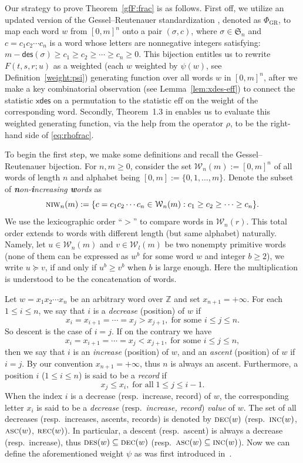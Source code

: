 \documentclass[12pt]{amsart}
\numberwithin{equation}{section}
\theoremstyle{plain}
\theoremstyle{definition}
\newcommand{\Z}{\mathbb{Z}}
\def\xdes{\mathsf{xdes}}
\def\DES{\hbox{\rm\textsc{des}}}
\def\DEC{\hbox{\rm\textsc{dec}}}
\def\INC{\hbox{\rm\textsc{inc}}}
\def\REC{\hbox{\rm\textsc{rec}}}
\def\NIW{\hbox{\rm\textsc{niw}}}
\def\des{\mathsf{des}}
\def\S{\mathfrak{S}}
\def\W{\mathcal{W}}
\def\eff{\mathrm{eff}}
\def\ASC{\hbox{\rm\textsc{asc}}}
\begin{document}
Our strategy to prove Theorem~\ref{gfF:frac} is as follows. First off, we utilize an updated version of the Gessel--Reutenauer standardization \cite{ge, fh, fh3}, denoted as $\Phi_{\mathrm{GR}}$, to map each word $w$ from $[0,m]^n$ onto a pair $(\sigma,c)$, where $\sigma\in\S_n$ and $c=c_1c_2\cdots c_n$ is a word whose letters are nonnegative integers satisfying: $m-\des(\sigma)\ge c_1\ge c_2\ge\cdots\ge c_n\ge 0$. This bijection entitles us to rewrite $F(t,s,r ;u)$ as a weighted (each $w$ weighted by $\psi(w)$, see Definition~\ref{weight:psi}) generating function over all words $w$ in $[0,m]^n$, after we make a key combinatorial observation (see Lemma~\ref{lem:xdes-eff}) to connect the statistic $\xdes$ on a permutation to the statistic $\eff$ on the weight of the corresponding word. Secondly, Theorem~1.3 in \cite{fh} enables us to evaluate this weighted generating function, via the help from the operator $\rho$, to be the right-hand side of \eqref{eq:rhofrac}. 

To begin the first step, we make some definitions and recall the Gessel--Reutenauer bijection. For $n,m\ge 0$, consider the set $\W_n(m):=[0,m]^n$ of all words of length $n$ and alphabet being $[0,m]:=\{0,1,\ldots,m\}$. Denote the subset of {\em {\bf\em n}on-{\bf\em i}ncreasing {\bf\em w}ords} as
$$\NIW_n(m):=\{c=c_1c_2\cdots c_n\in\W_n(m): c_1\ge c_2\ge\cdots\ge c_n\}.$$
We use the lexicographic order ``$>$'' to compare words in $\W_n(r)$. This total order extends to words with different length (but same alphabet) naturally. Namely, let $u\in\W_n(m)$ and $v\in\W_l(m)$ be two nonempty primitive words (none of them can be expressed as $w^b$ for some word $w$ and integer $b\ge 2$), we write $u\succeq v$, if and only if $u^b\ge v^b$ when $b$ is large enough. Here the multiplication is understood to be the concatenation of words.

Let $w=x_1x_2\cdots x_n$ be an arbitrary word over $\Z$ and set $x_{n+1}=+\infty$. For each $1\le i\le n$, we say that $i$ is a {\em decrease} (position) of $w$ if $$x_i= x_{i+1}=\cdots= x_j> x_{j+1},\; \text{for some $i\le j\le n$}.$$ So descent is the case of $i=j$. If on the contrary we have $$x_i= x_{i+1}=\cdots= x_j< x_{j+1},\; \text{for some $i\le j\le n$},$$ then we say that $i$ is an {\em increase} (position) of $w$, and an {\em ascent} (position) of $w$ if $i=j$. By our convention $x_{n+1}=+\infty$, thus $n$ is always an ascent. Furthermore, a position $i$ ($1\le i\le n$) is said to be a {\em record} if $$x_j\le x_i,\;\text{for all}\; 1\le j\le i-1.$$ When the index $i$ is a decrease (resp.~increase, record) of $w$, the corresponding letter $x_i$ is said to be a {\em decrease} (resp.~{\em increase, record}) {\em value} of $w$. The set of all decreases (resp.~increases, ascents, records) is denoted by $\DEC(w)$ (resp.~$\INC(w)$, $\ASC(w)$, $\REC(w)$). In particular, a descent (resp.~ascent) is always a decrease (resp.~increase), thus $\DES(w)\subseteq \DEC(w)$ (resp.~$\ASC(w)\subseteq \INC(w)$). Now we can define the aforementioned weight $\psi$ as was first introduced in~\cite{fh}.
\end{document}
